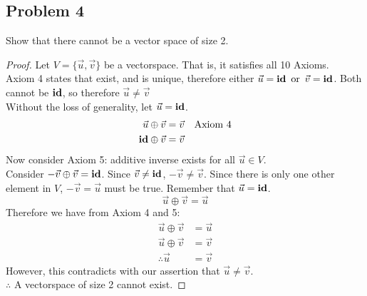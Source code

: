 \subsection*{Problem 4}
Show that there cannot be a vector space of size 2.
\begin{proof}
  Let $V = \{\vec{u}, \vec{v}\}$ be a vectorspace. That is, it satisfies all 10 Axioms. \\
  Axiom 4 states that  exist, and is unique, therefore either $\vec{u} = \textbf{id} \operatorname{~\text{or}~} \vec{v} = \textbf{id}$. Both cannot be $\textbf{id}$, so therefore $\vec{u} \neq \vec{v}$ \\
  Without the loss of generality, let $\vec{u} = \textbf{id}$.
  \begin{align*}
    \vec{u} \oplus \vec{v}  & = \vec{v} & \text{Axiom 4} \\
    \textbf{id} \oplus \vec{v} & = \vec{v}
  \end{align*}
  Now consider Axiom 5: additive inverse exists for all $\vec{u} \in V$. \\
  Consider $-\vec{v} \oplus \vec{v} = \textbf{id}$. Since $\vec{v} \neq \textbf{id}$, $-\vec{v} \neq \vec{v}$. Since there is only one other element in $V$, $-\vec{v} = \vec{u}$ must be true. Remember that $\vec{u} = \textbf{id}$.
  \[
    \vec{u} \oplus \vec{v} = \vec{u}
  \]
  Therefore we have from Axiom 4 and 5:
  \begin{align*}
    \vec{u} \oplus \vec{v} & = \vec{u} \\
    \vec{u} \oplus \vec{v} & = \vec{v} \\
    \therefore \vec{u}     & = \vec{v}
  \end{align*}
  However, this contradicts with our assertion that $\vec{u} \neq \vec{v}$. \\
  $\therefore$ A vectorspace of size 2 cannot exist.

\end{proof}
